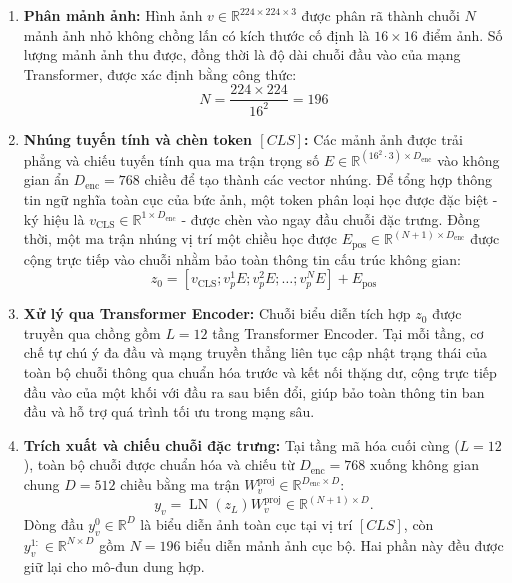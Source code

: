 \begin{enumerate}
    \item \textbf{Phân mảnh ảnh:} Hình ảnh $v \in \mathbb{R}^{224 \times 224 \times 3}$ được phân rã thành chuỗi $N$ mảnh ảnh nhỏ không chồng lấn có kích thước cố định là $16 \times 16$ điểm ảnh. Số lượng mảnh ảnh thu được, đồng thời là độ dài chuỗi đầu vào của mạng Transformer, được xác định bằng công thức:
    \begin{equation}
    N = \frac{224 \times 224}{16^2} = 196
    \end{equation}
    
    \item \textbf{Nhúng tuyến tính và chèn token $[CLS]$:} Các mảnh ảnh được trải phẳng và chiếu tuyến tính qua ma trận trọng số $E \in \mathbb{R}^{(16^2 \cdot 3) \times D_{\mathrm{enc}}}$ vào không gian ẩn $D_{\mathrm{enc}}=768$ chiều để tạo thành các vector nhúng. Để tổng hợp thông tin ngữ nghĩa toàn cục của bức ảnh, một token phân loại học được đặc biệt - ký hiệu là $v_{\text{CLS}} \in \mathbb{R}^{1 \times D_{\mathrm{enc}}}$ - được chèn vào ngay đầu chuỗi đặc trưng. Đồng thời, một ma trận nhúng vị trí một chiều học được $E_{\text{pos}} \in \mathbb{R}^{(N+1) \times D_{\mathrm{enc}}}$ được cộng trực tiếp vào chuỗi nhằm bảo toàn thông tin cấu trúc không gian:
    \begin{equation}
    z_0 = [v_{\text{CLS}}; v_p^1 E; v_p^2 E; \dots; v_p^N E] + E_{\text{pos}}
    \end{equation}
    
    \item \textbf{Xử lý qua Transformer Encoder:} Chuỗi biểu diễn tích hợp $z_0$ được truyền qua chồng gồm $L = 12$ tầng Transformer Encoder. Tại mỗi tầng, cơ chế tự chú ý đa đầu và mạng truyền thẳng liên tục cập nhật trạng thái của toàn bộ chuỗi thông qua chuẩn hóa trước và kết nối thặng dư, cộng trực tiếp đầu vào của một khối với đầu ra sau biến đổi, giúp bảo toàn thông tin ban đầu và hỗ trợ quá trình tối ưu trong mạng sâu.
    
    \item \textbf{Trích xuất và chiếu chuỗi đặc trưng:} Tại tầng mã hóa cuối cùng ($L=12$), toàn bộ chuỗi được chuẩn hóa và chiếu từ $D_{\mathrm{enc}}=768$ xuống không gian chung $D=512$ chiều bằng ma trận $W_v^{\mathrm{proj}}\in\mathbb{R}^{D_{\mathrm{enc}}\times D}$:
    \begin{equation}
    y_v = \operatorname{LN}(z_L)W_v^{\mathrm{proj}}
    \in \mathbb{R}^{(N+1)\times D}.
    \end{equation}
    Dòng đầu $y_v^0\in\mathbb{R}^{D}$ là biểu diễn ảnh toàn cục tại vị trí $[CLS]$, còn $y_v^{1:}\in\mathbb{R}^{N\times D}$ gồm $N=196$ biểu diễn mảnh ảnh cục bộ. Hai phần này đều được giữ lại cho mô-đun dung hợp.
\end{enumerate}

